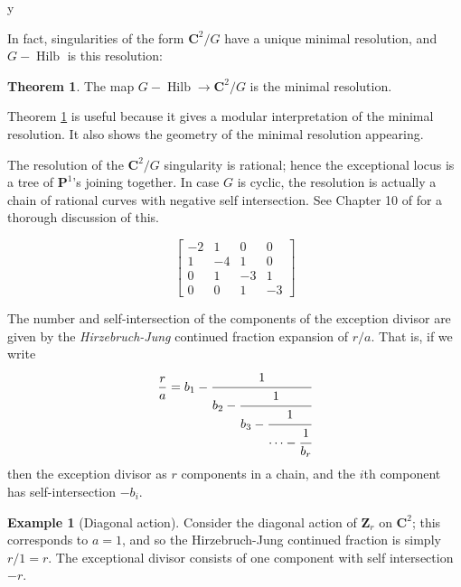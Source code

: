 y\documentclass{amsart}[12pt]
\theoremstyle{definition}
\newtheorem{theorem}[dummy]{Theorem}
\newtheorem{example}[dummy]{Example}
\newcommand{\Z}{\mathbf{Z}}
\newcommand{\C}{\mathbf{C}}
\newcommand{\proj}{\mathbf{P}}
\DeclareMathOperator{\Hilb}{Hilb}
\begin{document}
In fact, singularities of the form $\C^2/G$ have a unique minimal resolution, and $G-\Hilb$ is this resolution:





\begin{theorem} \label{thm:GHilb-resolution}
The map $G-\Hilb\to \C^2/G$ is the minimal resolution.
\end{theorem}

Theorem \ref{thm:GHilb-resolution} is useful because it gives a modular interpretation of the minimal resolution.  It also shows the geometry of the minimal resolution appearing.

The resolution of the $\C^2/G$ singularity is rational; hence the exceptional locus is a tree of $\proj^1$'s joining together.  In case $G$ is cyclic, the resolution is actually a chain of rational curves with negative self intersection.  See Chapter 10 of \cite{toric} for a thorough discussion of this.

\begin{center}
\end{center}

$$
\begin{bmatrix}
-2 & 1 & 0 & 0 \\
1 & -4 & 1 & 0 \\
0 & 1 & -3 & 1 \\
0 & 0 & 1 & -3 
\end{bmatrix}
$$

The number and self-intersection of the components of the exception divisor are given by the \emph{Hirzebruch-Jung} continued fraction expansion of $r/a$.  That is, if we write
$$
\frac{r}{a}=b_1-\cfrac{1}{b_2-\cfrac{1}{b_3-\cfrac{1}{\cdots - \cfrac{1}{b_r}}}}
$$  
then the exception divisor as $r$ components in a chain, and the $i$th component has self-intersection $-b_i$. 

\begin{example}[Diagonal action]
Consider the diagonal action of $\Z_r$ on $\C^2$; this corresponds to $a=1$, and so the Hirzebruch-Jung continued fraction is simply $r/1=r$.  The exceptional divisor consists of one component with self intersection $-r$.

\end{example}
\end{document}
